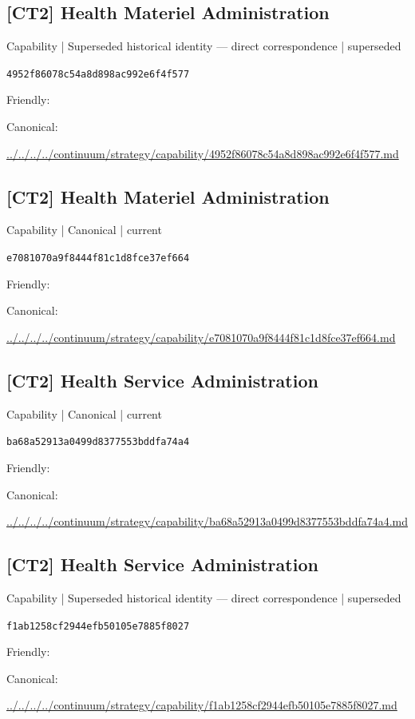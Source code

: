 \documentclass[10pt,a4paper]{article}
\begin{document}
\subsection*{[CT2] Health Materiel Administration}
{\small Capability | Superseded historical identity — direct correspondence | superseded}\par
\texttt{4952f86078c54a8d898ac992e6f4f577}\par
Friendly: \par
Canonical: \par
{\footnotesize\url{../../../../continuum/strategy/capability/4952f86078c54a8d898ac992e6f4f577.md}}\par
\subsection*{[CT2] Health Materiel Administration}
{\small Capability | Canonical | current}\par
\texttt{e7081070a9f8444f81c1d8fce37ef664}\par
Friendly: \par
Canonical: \par
{\footnotesize\url{../../../../continuum/strategy/capability/e7081070a9f8444f81c1d8fce37ef664.md}}\par
\subsection*{[CT2] Health Service Administration}
{\small Capability | Canonical | current}\par
\texttt{ba68a52913a0499d8377553bddfa74a4}\par
Friendly: \par
Canonical: \par
{\footnotesize\url{../../../../continuum/strategy/capability/ba68a52913a0499d8377553bddfa74a4.md}}\par
\subsection*{[CT2] Health Service Administration}
{\small Capability | Superseded historical identity — direct correspondence | superseded}\par
\texttt{f1ab1258cf2944efb50105e7885f8027}\par
Friendly: \par
Canonical: \par
{\footnotesize\url{../../../../continuum/strategy/capability/f1ab1258cf2944efb50105e7885f8027.md}}\par
\end{document}
